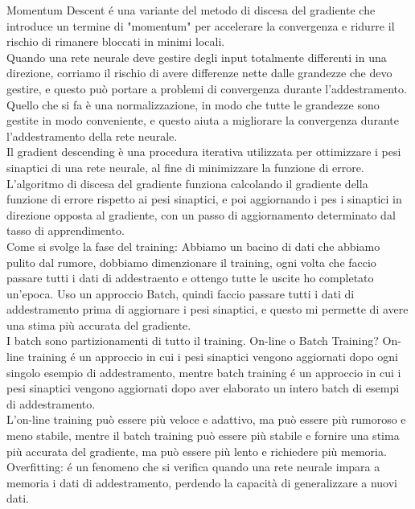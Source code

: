 Momentum Descent é una variante del metodo di discesa del gradiente che introduce un termine di "momentum" per accelerare 
la convergenza e ridurre il rischio di rimanere bloccati in minimi locali.\\

Quando una rete neurale deve gestire degli input totalmente differenti in una direzione, corriamo il rischio di avere 
differenze nette dalle grandezze che devo gestire, e questo può portare a problemi di convergenza durante l'addestramento.\\
Quello che si fa è una normalizzazione, in modo che tutte le grandezze sono gestite in modo conveniente, e questo aiuta a migliorare 
la convergenza durante l'addestramento della rete neurale.\\

Il gradient descending è una procedura iterativa utilizzata per ottimizzare i pesi sinaptici di una rete neurale, al fine di minimizzare la funzione di errore.\\
L'algoritmo di discesa del gradiente funziona calcolando il gradiente della funzione di errore rispetto ai pesi sinaptici, e poi aggiornando i pes
i sinaptici in direzione opposta al gradiente, con un passo di aggiornamento determinato dal tasso di apprendimento.\\

Come si svolge la fase del training:
Abbiamo un bacino di dati che abbiamo pulito dal rumore, dobbiamo dimenzionare il training, ogni volta che faccio passare tutti i dati 
di addestraento e ottengo tutte le uscite ho completato un'epoca. Uso un approccio Batch, quindi faccio passare tutti i dati di addestramento 
prima di aggiornare i pesi sinaptici, e questo mi permette di avere una stima più accurata del gradiente.\\
I batch sono partizionamenti di tutto il training.
On-line o Batch Training?
On-line training é un approccio in cui i pesi sinaptici vengono aggiornati dopo ogni singolo esempio di addestramento, 
mentre batch training é un approccio in cui i pesi sinaptici vengono aggiornati dopo aver elaborato un intero batch di esempi di addestramento.\\
L'on-line training può essere più veloce e adattivo, ma può essere più rumoroso e meno stabile, mentre il batch training può essere più stabile e 
fornire una stima più accurata del gradiente, ma può essere più lento e richiedere più memoria.\\

Overfitting: é un fenomeno che si verifica quando una rete neurale impara a memoria i dati di addestramento, perdendo la capacità di generalizzare a nuovi dati.\\

